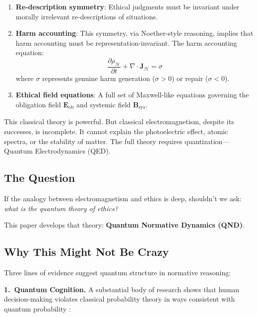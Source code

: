 \documentclass[12pt]{article}
\begin{document}
\begin{enumerate}
    \item \textbf{Re-description symmetry}: Ethical judgments must be invariant under morally irrelevant re-descriptions of situations.

    \item \textbf{Harm accounting}: This symmetry, via Noether-style reasoning, implies that harm accounting must be representation-invariant. The harm accounting equation:
    \begin{equation}
        \frac{\partial \rho_{\mathcal{H}}}{\partial t} + \nabla \cdot \mathbf{J}_{\mathcal{H}} = \sigma
    \end{equation}
    where $\sigma$ represents genuine harm generation ($\sigma > 0$) or repair ($\sigma < 0$).

    \item \textbf{Ethical field equations}: A full set of Maxwell-like equations governing the obligation field $\mathbf{E}_{\text{ob}}$ and systemic field $\mathbf{B}_{\text{sys}}$.
\end{enumerate}

This classical theory is powerful. But classical electromagnetism, despite its successes, is incomplete. It cannot explain the photoelectric effect, atomic spectra, or the stability of matter. The full theory requires quantization---Quantum Electrodynamics (QED).

\subsection{The Question}

If the analogy between electromagnetism and ethics is deep, shouldn't we ask: \emph{what is the quantum theory of ethics?}

This paper develops that theory: \textbf{Quantum Normative Dynamics (QND)}.

\subsection{Why This Might Not Be Crazy}

Three lines of evidence suggest quantum structure in normative reasoning:

\textbf{1.\ Quantum Cognition.} A substantial body of research shows that human decision-making violates classical probability theory in ways consistent with quantum probability \cite{busemeyer2012,pothos2013,bruza2015}:
\end{document}
